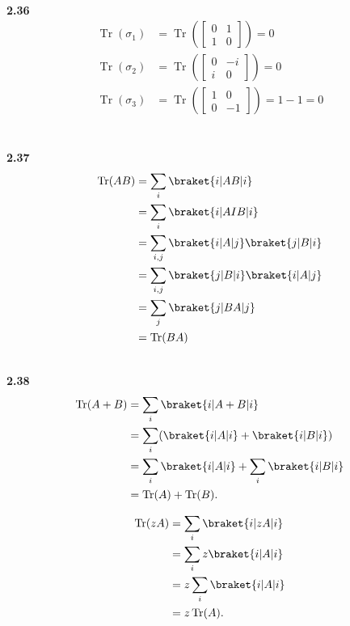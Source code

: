 \documentclass[10pt]{book}
\DeclareMathOperator{\Tr}{Tr}
\newcommand{\Textbf}[1]{\hspace{3mm}\\ \textbf{#1}\\}
\begin{document}
	
	\Textbf{2.36}
	\begin{equation}
\begin{aligned}
		\Tr (\sigma_1) &= \Tr \left(
		\begin{bmatrix}
			0 & 1 \\
			1 & 0
		\end{bmatrix}
		\right) = 0\\
		\Tr (\sigma_2) &= \Tr \left(
		\begin{bmatrix}
			0 & -i \\
			i & 0
		\end{bmatrix}
		\right) = 0\\
		\Tr (\sigma_3) &= \Tr \left(
		\begin{bmatrix}
			1 & 0 \\
			0 & -1
		\end{bmatrix}
		\right) = 1 -1 = 0\\
	\end{aligned}
\end{equation}
	
	
	
	
	\Textbf{2.37}
	\begin{equation}
\begin{aligned}
		\Tr (AB) &= \sum_i \braket{i | AB | i}\\
		&=\sum_i \braket{i | A I B | i}\\
		&= \sum_{i,j} \braket{i | A | j}\braket{j | B | i}\\
		&= \sum_{i,j} \braket{j | B | i} \braket{i | A | j}\\
		&= \sum_j \braket{j | BA | j}\\
		&= \Tr (BA)
	\end{aligned}
\end{equation}
	
	
	
	\Textbf{2.38}
	\begin{equation}
\begin{aligned}
		\Tr (A + B) &= \sum_i \braket{i | A+B | i}\\
		&= \sum_i (\braket{i|A|i}  + \braket{i | B | i}  )\\
		&= \sum_i \braket{i|A|i} + \sum_i \braket{i|B|i}\\
		&= \Tr (A) + \Tr (B).
	\end{aligned}
\end{equation}
	
	\begin{equation}
\begin{aligned}
		\Tr (z A) &=  \sum_i \braket{i | z A | i}\\
		&= \sum_i z \braket{i | A | i}\\
		&= z \sum_i \braket{i | A | i}\\
		&= z \Tr (A).
	\end{aligned}
\end{equation}
	
\end{document}
